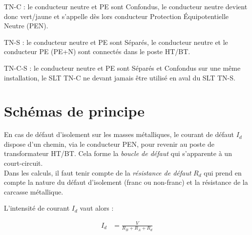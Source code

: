 \begin{description}
\item{TN-C :} le conducteur neutre et PE sont Confondus, le conducteur neutre devient donc vert/jaune et s'appelle dès lors conducteur Protection \'Equipotentielle Neutre (PEN).
\item{TN-S :} le conducteur neutre et PE sont Séparés, le conducteur neutre et le conducteur PE (PE+N) sont connectés dans le poste HT/BT.
\item{TN-C-S :} le conducteur neutre et PE sont Séparés et Confondus sur une même installation, le SLT TN-C ne devant jamais être utilisé en aval du SLT TN-S.
\end{description}
\section{Schémas de principe}

\begin{figure}[h]
\caption{Installation Terre-Neutre Confondu}
\begin{subfigure}[t]{0.49\linewidth}

\end{subfigure}
\begin{subfigure}[t]{0.49\linewidth}

\end{subfigure}
\end{figure}

En cas de défaut d'isolement sur les masses métalliques, le courant de défaut $I_d$ dispose d'un chemin, via le conducteur PEN, pour revenir au poste de transformateur HT/BT. Cela forme la \emph{boucle de défaut} qui s'apparente à un court-circuit.\\



Dans les calculs, il faut tenir compte de la \emph{résistance de défaut} $R_d$ qui prend en compte la nature du défaut d'isolement (franc ou non-franc) et la résistance de la carcasse métallique.\\

\pagebreak



L'intensité de courant $I_d$ vaut alors :
\begin{formule}
\begin{align}
		I_d &= \frac{V}{R_{B}+R_{A}+R_{d}}
\end{align}
\end{formule}


